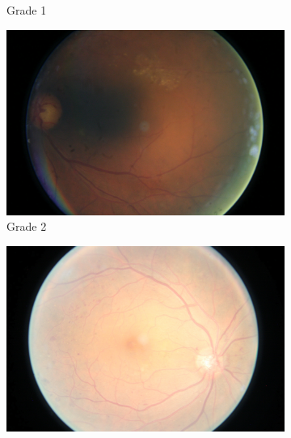 \begin{figure}[htbp]
\begin{subfigure}[b]{0.19\textwidth}
        \caption{Grade 1}
    \end{subfigure}
    \hfill
    \begin{subfigure}[b]{0.19\textwidth}
        \centering
        \includegraphics[width=\textwidth, height=\textwidth]{figures/chapter4/Dataset/moderate/54_right.jpeg}
        \caption{Grade 2}
    \end{subfigure}
    \hfill
    \begin{subfigure}[b]{0.19\textwidth}
        \centering
        \includegraphics[width=\textwidth, height=\textwidth]{figures/chapter4/Dataset/severe/326_right.jpeg}

\end{subfigure}
\end{figure}
